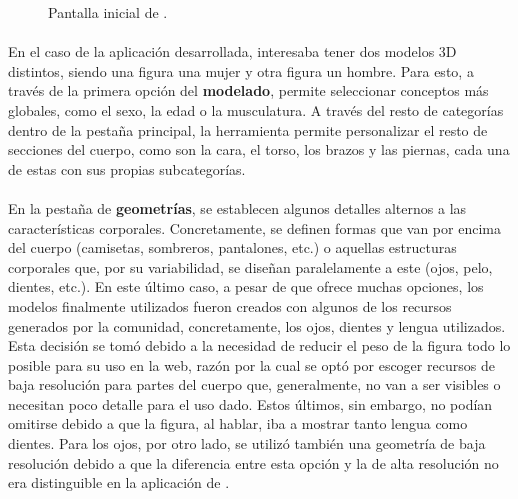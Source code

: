 \documentclass{subfiles}
\begin{document}
    \begin{figure}
    \centering
    \caption{Pantalla inicial de \makehuman.}
    \label{fig:makehuman_landing}
    \end{figure}

    \paragraph{}
    En el caso de la aplicación desarrollada, interesaba tener dos modelos 3D distintos, siendo una figura una mujer y otra figura un hombre. Para esto, a través de la primera opción del \textbf{modelado}, \makehuman permite seleccionar conceptos más globales, como el sexo, la edad o la musculatura. A través del resto de categorías dentro de la pestaña principal, la herramienta permite personalizar el resto de secciones del cuerpo, como son la cara, el torso, los brazos y las piernas, cada una de estas con sus propias subcategorías.

    \paragraph{}
    En la pestaña de \textbf{geometrías}, se establecen algunos detalles alternos a las características corporales. Concretamente, se definen formas que van por encima del cuerpo (camisetas, sombreros, pantalones, etc.) o aquellas estructuras corporales que, por su variabilidad, se diseñan paralelamente a este (ojos, pelo, dientes, etc.). En este último caso, a pesar de que \makehuman ofrece muchas opciones, los modelos finalmente utilizados fueron creados con algunos de los recursos generados por la comunidad, concretamente, los ojos, dientes y lengua utilizados. Esta decisión se tomó debido a la necesidad de reducir el peso de la figura todo lo posible para su uso en la web, razón por la cual se optó por escoger recursos de baja resolución para partes del cuerpo que, generalmente, no van a ser visibles o necesitan poco detalle para el uso dado. Estos últimos, sin embargo, no podían omitirse debido a que la figura, al hablar, iba a mostrar tanto lengua como dientes. Para los ojos, por otro lado, se utilizó también una geometría de baja resolución debido a que la diferencia entre esta opción y la de alta resolución no era distinguible en la aplicación de \ra.
\end{document}
